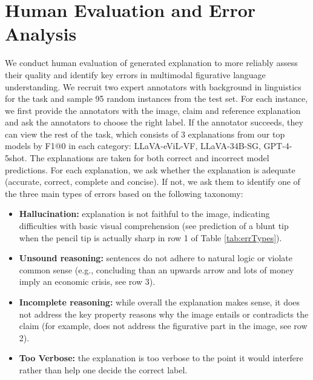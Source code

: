 \section{Human Evaluation and Error Analysis} \label{sec:humanEval}

We conduct human evaluation of generated explanation to more reliably assess their quality and identify key errors in multimodal figurative language understanding. We recruit two expert annotators with background in linguistics for the task and sample 95 random instances from the test set. For each instance, we first provide the annotators with the image, claim and reference explanation and ask the annotators to choose the right label. If the annotator succeeds, they can view the rest of the task, which consists of 3 explanations from our top models by F1@0 in each category: LLaVA-eViL-VF, LLaVA-34B-SG, GPT-4-5shot. The explanations are taken for both correct and incorrect model predictions. For each explanation, we ask whether the explanation is adequate (accurate, correct, complete and concise). 
If not, we ask them to identify one of the three main types of errors based on the following taxonomy:

\begin{itemize}[leftmargin=*]
    \itemsep0em 
    \item \textbf{Hallucination:} explanation is not faithful to the image, indicating difficulties with basic visual comprehension (see prediction of a blunt tip when the pencil tip is actually sharp in row 1 of Table \ref{tab:errTypes}).
    \item \textbf{Unsound reasoning:} sentences do not adhere to natural logic or violate common sense (e.g., concluding than an upwards arrow and lots of money imply an economic crisis, see row 3).
    \item \textbf{Incomplete reasoning:} while overall the explanation makes sense, it does not address the key property reasons why the image entails or contradicts the claim (for example, does not address the figurative part in the image, see row 2).
    \item \textbf{Too Verbose:} the explanation is too verbose to the point it would interfere rather than help one decide the correct label.
\end{itemize}


